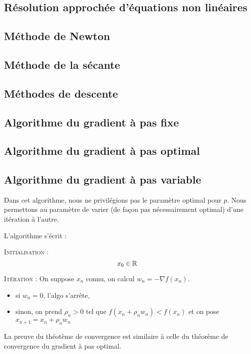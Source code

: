 \subsection{Résolution approchée d'équations non linéaires}
\subsection{Méthode de Newton}



\subsection{Méthode de la sécante}
\subsection{Méthodes de descente}
\subsection{Algorithme du gradient à pas fixe}
\subsection{Algorithme du gradient à pas optimal}



\subsection{Algorithme du gradient à pas variable}

Dans cet algorithme, nous ne privilégions pas le paramètre optimal pour $p$. Nous permettons au paramètre de varier (de façon pas nécessairement optimal) d'une itération à l'autre.

L'algorithme s'écrit :

\textsc{Initialisation :}
\[ x_0 \in \mathbb{R} \]

\textsc{Itération :}
On suppose $x_n$ connu, on calcul $w_n=-\nabla f(x_n)$.
\begin{itemize}
\item si $w_n=0$, l'algo s'arrête,
\item sinon, on prend $\rho_n>0$ tel que $f(x_n+\rho_nw_n)<f(x_n)$ et on pose $x_{n+1}=x_n+\rho_nw_n$
\end{itemize}

La preuve du théotème de convergence est similaire à celle du théorème de convergence du gradient à pas optimal.

